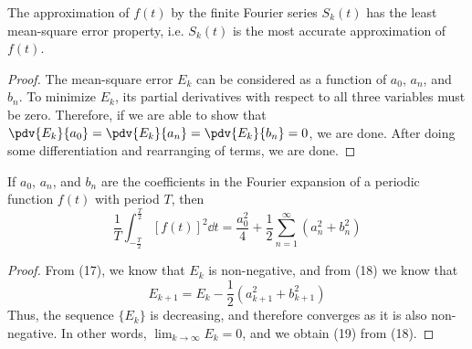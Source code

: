\begin{claim} The approximation of $f(t)$ by the finite Fourier series $S_k(t)$ has the least mean-square error property, i.e. $S_k(t)$ is the most accurate approximation of $f(t)$. \end{claim}

\begin{proof} The mean-square error $E_k$ can be considered as a function of $a_0$, $a_n$, and $b_n$. To minimize $E_k$, its partial derivatives with respect to all three variables must be zero. Therefore, if we are able to show that $\pdv{E_k}{a_0}=\pdv{E_k}{a_n}=\pdv{E_k}{b_n}=0$, we are done. After doing some differentiation and rearranging of terms, we are done. \end{proof}

\begin{lemma} If $a_0$, $a_n$, and $b_n$ are the coefficients in the Fourier expansion of a periodic function $f(t)$ with period $T$, then \begin{equation} \frac1T\int_{-\frac T2}^{\frac T2}[f(t)]^2\dd{t}=\frac{a_0^2}{4}+\frac12\sum_{n=1}^\infty(a_n^2+b_n^2)
\end{equation}
\end{lemma}

\begin{proof}
From (17), we know that $E_k$ is non-negative, and from (18) we know that \begin{equation} E_{k+1}=E_k-\frac12\left(a_{k+1}^2+b_{k+1}^2\right)
\end{equation}
Thus, the sequence $\{E_k\}$ is decreasing, and therefore converges as it is also non-negative. In other words, $\lim_{k\to\infty}E_k=0$, and we obtain (19) from (18).
\end{proof}
